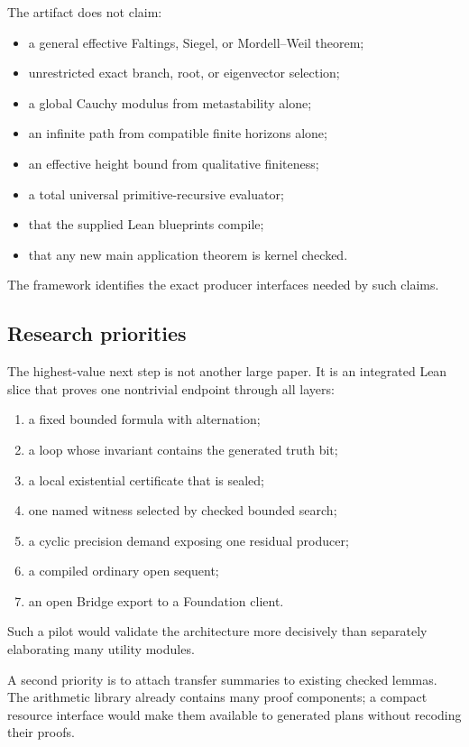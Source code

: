 The artifact does not claim:
\begin{itemize}
  \item a general effective Faltings, Siegel, or Mordell--Weil theorem;
  \item unrestricted exact branch, root, or eigenvector selection;
  \item a global Cauchy modulus from metastability alone;
  \item an infinite path from compatible finite horizons alone;
  \item an effective height bound from qualitative finiteness;
  \item a total universal primitive-recursive evaluator;
  \item that the supplied Lean blueprints compile;
  \item that any new main application theorem is kernel checked.
\end{itemize}
The framework identifies the exact producer interfaces needed by such claims.

\subsection{Research priorities}

The highest-value next step is not another large paper.  It is an integrated
Lean slice that proves one nontrivial endpoint through all layers:
\begin{enumerate}
  \item a fixed bounded formula with alternation;
  \item a loop whose invariant contains the generated truth bit;
  \item a local existential certificate that is sealed;
  \item one named witness selected by checked bounded search;
  \item a cyclic precision demand exposing one residual producer;
  \item a compiled ordinary open sequent;
  \item an open Bridge export to a Foundation client.
\end{enumerate}
Such a pilot would validate the architecture more decisively than separately
elaborating many utility modules.

A second priority is to attach transfer summaries to existing checked
 lemmas.  The arithmetic library already contains
many proof components; a compact resource interface would make them available
to generated plans without recoding their proofs.

